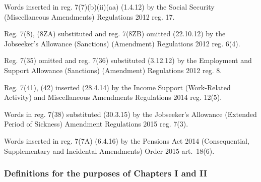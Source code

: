 \documentclass[12pt,a4paper]{article}
\begin{document}
{Words inserted in reg. 7(7)(b)(ii)(aa) (1.4.12) by the Social Security (Miscellaneous Amendments) Regulations 2012 reg. 17.

Reg. 7(8), (8ZA) substituted and reg. 7(8ZB) omitted (22.10.12) by the Jobseeker’s Allowance (Sanctions) (Amendment) Regulations 2012 reg. 6(4).

Reg. 7(35) omitted and reg. 7(36) substituted (3.12.12) by the Employment and Support Allowance (Sanctions) (Amendment) Regulations 2012 reg. 8.

Reg. 7(41), (42) inserted (28.4.14) by the Income Support (Work-Related Activity) and Miscellaneous Amendments Regulations 2014 reg. 12(5).

Words in reg. 7(38) substituted (30.3.15) by the Jobseeker’s Allowance (Extended Period of Sickness) Amendment Regulations 2015 reg. 7(3).

Words inserted in reg. 7(7A) (6.4.16) by the Pensions Act 2014 (Consequential, Supplementary and Incidental Amendments) Order 2015 art.~18(6).
}


\subsubsection[7A. Definitions for the purposes of Chapters I and II]{Definitions for the purposes of Chapters I and II}
\end{document}
